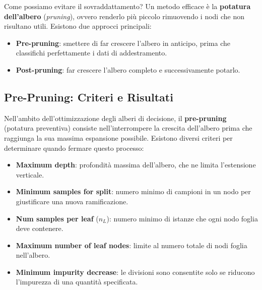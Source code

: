 Come possiamo evitare il sovraddattamento? Un metodo
efficace è la \textbf{potatura dell'albero}
(\textit{pruning}), ovvero renderlo più piccolo rimuovendo
i nodi che non risultano utili. Esistono due approcci
principali:

\begin{itemize}
    \item \textbf{Pre-pruning}: smettere di far crescere
        l'albero in anticipo, prima che classifichi
        perfettamente i dati di addestramento.
    \item \textbf{Post-pruning}: far crescere l'albero
        completo e successivamente potarlo.
\end{itemize}


\subsection{Pre-Pruning: Criteri e Risultati}

Nell'ambito dell'ottimizzazione degli alberi di decisione,
il \textbf{pre-pruning} (potatura preventiva) consiste
nell'interrompere la crescita dell'albero prima che raggiunga
la sua massima espansione possibile. Esistono diversi criteri
per determinare quando fermare questo processo:

\begin{itemize}
    \item \textbf{Maximum depth}: profondità massima
        dell'albero, che ne limita l'estensione verticale.
    \item \textbf{Minimum samples for split}: numero
        minimo di campioni in un nodo per giustificare
        una nuova ramificazione.
    \item \textbf{Num samples per leaf} ($n_L$): numero
        minimo di istanze che ogni nodo foglia deve
        contenere.
    \item \textbf{Maximum number of leaf nodes}: limite
        al numero totale di nodi foglia nell'albero.
    \item \textbf{Minimum impurity decrease}: le
        divisioni sono consentite solo se riducono
        l'impurezza di una quantità specificata.
\end{itemize}

